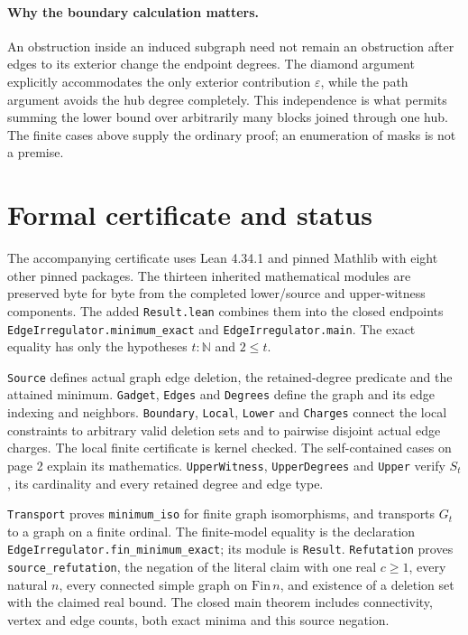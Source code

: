 \documentclass[11pt]{article}
\begin{document}
\paragraph{Why the boundary calculation matters.}
An obstruction inside an induced subgraph need not remain an obstruction
after edges to its exterior change the endpoint degrees. The diamond
argument explicitly accommodates the only exterior contribution
$\varepsilon$, while the path argument avoids the hub degree completely.
This independence is what permits summing the lower bound over arbitrarily
many blocks joined through one hub. The finite cases above supply the
ordinary proof; an enumeration of masks is not a premise.

\newpage
\section{Formal certificate and status}
\raggedright
The accompanying certificate uses Lean 4.34.1 and pinned Mathlib with eight
other pinned packages. The thirteen inherited mathematical modules are
preserved byte for byte from the completed lower/source and upper-witness
components. The added \texttt{Result.lean} combines them into the closed
endpoints \texttt{EdgeIrregulator.minimum\_exact} and
\texttt{EdgeIrregulator.main}. The exact equality has only the hypotheses
$t:\mathbb N$ and $2\le t$.

\texttt{Source} defines actual graph edge deletion, the retained-degree
predicate and the attained minimum. \texttt{Gadget}, \texttt{Edges} and
\texttt{Degrees} define the graph and its edge indexing and neighbors.
\texttt{Boundary}, \texttt{Local}, \texttt{Lower} and \texttt{Charges}
connect the local constraints to arbitrary valid deletion sets and to
pairwise disjoint actual edge charges. The local finite certificate is
kernel checked. The self-contained cases on page 2 explain its mathematics.
\texttt{UpperWitness}, \texttt{UpperDegrees} and \texttt{Upper} verify
$S_t$, its cardinality and every retained degree and edge type.

\texttt{Transport} proves \texttt{minimum\_iso} for finite graph
isomorphisms, and transports $G_t$ to a graph on a finite ordinal.
The finite-model equality is the declaration
\texttt{EdgeIrregulator.fin\_minimum\_exact}; its module is \texttt{Result}.
\texttt{Refutation} proves \texttt{source\_refutation}, the negation of the
literal claim with one real $c\ge1$, every natural $n$, every connected
simple graph on $\mathrm{Fin}\,n$, and existence of a deletion set with
the claimed real bound. The closed main theorem includes connectivity,
vertex and edge counts, both exact minima and this source negation.
\end{document}
